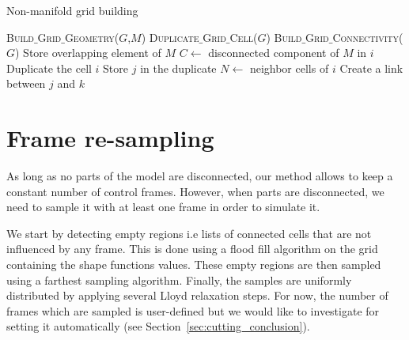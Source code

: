 \begin{algorithm}[!h]
\caption[Frame-based cutting: Non-manifold grid building]{\label{alg:nonmanifoldbuilding}Non-manifold grid building}
\begin{algorithmic}[1]
\State \textsc{Build$\_$Grid$\_$Geometry}($G$,$M$)
\State \textsc{Duplicate$\_$Grid$\_$Cell}($G$)
\State \textsc{Build$\_$Grid$\_$Connectivity}($G$)
\EndProcedure
\State
{}
\State Store overlapping element of $M$
\EndFor
\EndProcedure
\State
{}
\State $C \gets $ disconnected component of $M$ in $i$
	\State Duplicate the cell $i$
	\State Store $j$ in the duplicate
\EndFor
\EndFor
\EndProcedure
\State
{}
\State $N \gets $ neighbor cells of $i$
\State Create a link between $j$ and $k$ 
\EndIf
\EndFor
\EndFor
\EndFor
\EndProcedure
\end{algorithmic}
\end{algorithm}

\newpage 


\section{Frame re-sampling} \label{sec:resampling}
As long as no parts of the model are disconnected, our method allows to keep a constant number of control frames. However, when parts are disconnected, we need to sample it with at least one frame in order to simulate it. 

We start by detecting empty regions i.e lists of connected cells that are not influenced by any frame. This is done using a flood fill algorithm on the grid containing the shape functions values. These empty regions are then sampled using a farthest sampling algorithm. Finally, the samples are uniformly distributed by applying several Lloyd relaxation steps. For now, the number of frames which are sampled is user-defined but we would like to investigate for setting it automatically (see Section~\ref{sec:cutting_conclusion}). 

